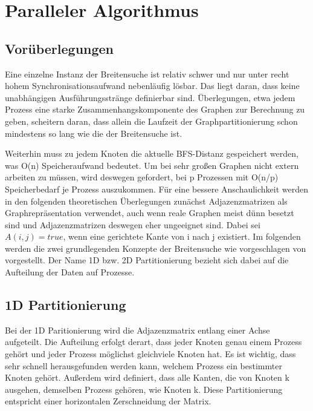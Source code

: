\chapter{Paralleler Algorithmus} %
\label{cha:paralleler_algorithmus}

\section{Vorüberlegungen} %
\label{sec:vor_berlegungen}
Eine einzelne Instanz der Breitensuche ist relativ schwer und nur unter recht hohem Synchronisationsaufwand nebenläufig lösbar. Das liegt daran, dass keine unabhängigen Ausführungsstränge definierbar sind. Überlegungen, etwa jedem Prozess eine starke Zusammenhangskomponente des Graphen zur Berechnung zu geben, scheitern daran, dass allein die Laufzeit der Graphpartitionierung schon mindestens so lang wie die der Breitensuche ist.

Weiterhin muss zu jedem Knoten die aktuelle BFS-Distanz gespeichert werden, was O(n) Speicheraufwand bedeutet. Um bei sehr großen Graphen nicht extern arbeiten zu müssen, wird deswegen gefordert, bei p Prozessen mit O(n/p) Speicherbedarf je Prozess auszukommen. Für eine bessere Anschaulichkeit werden in den folgenden theoretischen Überlegungen zunächst Adjazenzmatrizen als Graphrepräsentation verwendet, auch wenn reale Graphen meist dünn besetzt sind und Adjazenzmatrizen deswegen eher ungeeignet sind. Dabei sei $A(i,j) = true$, wenn eine gerichtete Kante von i nach j existiert. Im folgenden werden die zwei grundlegenden Konzepte der Breitensuche wie vorgeschlagen von \cite{Buluc:2011} vorgestellt. Der Name 1D bzw. 2D Partitionierung bezieht sich dabei auf die Aufteilung der Daten auf Prozesse.


\section{1D Partitionierung} %
\label{sec:1d_partitionierung}
Bei der 1D Paritionierung wird die Adjazenzmatrix entlang einer Achse aufgeteilt. Die Aufteilung erfolgt derart, dass jeder Knoten genau einem Prozess gehört und jeder Prozess möglichst gleichviele Knoten hat. Es ist wichtig, dass sehr schnell herausgefunden werden kann, welchem Prozess ein bestimmter Knoten gehört. Außerdem wird definiert, dass alle Kanten, die von Knoten k ausgehen, demselben Prozess gehören, wie Knoten k. Diese Partitionierung entspricht einer horizontalen Zerschneidung der Matrix.

